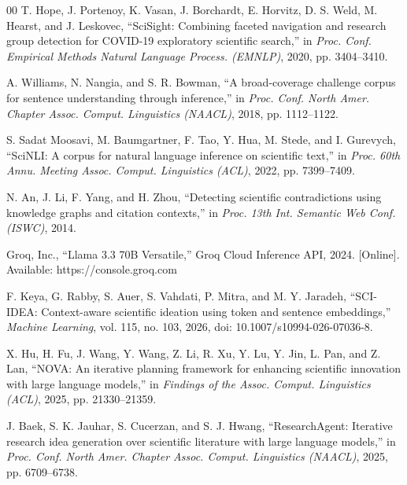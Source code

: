 \documentclass[conference]{IEEEtran}
\begin{document}
\begin{thebibliography}{00}
T. Hope, J. Portenoy, K. Vasan, J. Borchardt, E. Horvitz, D. S. Weld,
M. Hearst, and J. Leskovec, ``SciSight: Combining faceted navigation and
research group detection for COVID-19 exploratory scientific search,'' in
\textit{Proc. Conf. Empirical Methods Natural Language Process. (EMNLP)},
2020, pp. 3404--3410.

A. Williams, N. Nangia, and S. R. Bowman, ``A broad-coverage challenge
corpus for sentence understanding through inference,'' in \textit{Proc. Conf.
North Amer. Chapter Assoc. Comput. Linguistics (NAACL)}, 2018,
pp. 1112--1122.

S. Sadat Moosavi, M. Baumgartner, F. Tao, Y. Hua, M. Stede, and
I. Gurevych, ``SciNLI: A corpus for natural language inference on scientific
text,'' in \textit{Proc. 60th Annu. Meeting Assoc. Comput. Linguistics
(ACL)}, 2022, pp. 7399--7409.

N. An, J. Li, F. Yang, and H. Zhou, ``Detecting scientific contradictions
using knowledge graphs and citation contexts,'' in \textit{Proc. 13th Int.
Semantic Web Conf. (ISWC)}, 2014.

Groq, Inc., ``Llama 3.3 70B Versatile,'' Groq Cloud Inference API,
2024. [Online]. Available: https://console.groq.com

F. Keya, G. Rabby, S. Auer, S. Vahdati, P. Mitra, and M. Y. Jaradeh,
``SCI-IDEA: Context-aware scientific ideation using token and sentence
embeddings,'' \textit{Machine Learning}, vol. 115, no. 103, 2026,
doi: 10.1007/s10994-026-07036-8.

X. Hu, H. Fu, J. Wang, Y. Wang, Z. Li, R. Xu, Y. Lu, Y. Jin, L. Pan,
and Z. Lan, ``NOVA: An iterative planning framework for enhancing scientific
innovation with large language models,'' in \textit{Findings of the Assoc.
Comput. Linguistics (ACL)}, 2025, pp. 21330--21359.

J. Baek, S. K. Jauhar, S. Cucerzan, and S. J. Hwang,
``ResearchAgent: Iterative research idea generation over scientific
literature with large language models,'' in \textit{Proc. Conf. North
Amer. Chapter Assoc. Comput. Linguistics (NAACL)}, 2025,
pp. 6709--6738.

\end{thebibliography}
\end{document}
